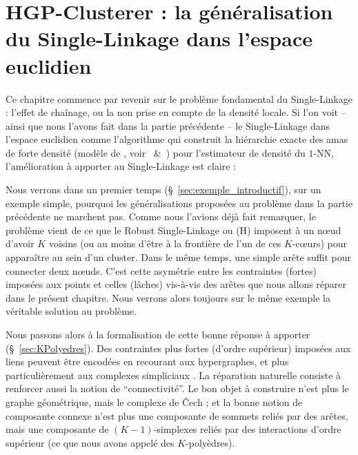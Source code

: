 \chapter{HGP-Clusterer : la généralisation du Single-Linkage dans l'espace euclidien} 
\label{chap:hgp_clusterer}

Ce chapitre commence par revenir sur le problème fondamental du Single-Linkage : l'effet de chaînage, ou la non prise en compte de la densité locale.
Si l'on voit -- ainsi que nous l'avons fait dans la partie précédente -- le Single-Linkage dans l'espace euclidien comme l'algorithme qui construit la hiérarchie exacte des amas de forte densité (modèle de , voir ~\&~) pour l'estimateur de densité du $1$-NN, l'amélioration à apporter au Single-Linkage est claire :

Nous verrons dans un premier temps (\S~\ref{sec:exemple_introductif}), sur un exemple simple, pourquoi les généralisations proposées au problème dans la partie précédente ne marchent pas. 
Comme nous l'avions déjà fait remarquer, le problème vient de ce que le Robust Single-Linkage \cite{RobustSingleLinkage2010} ou (H)\DBSCAN \cite{HDBSCAN, HDBSCAN2017} imposent à un n\oe ud d'avoir $K$ voisins  (ou au moins d'être à la frontière de l'un de ces $K$-cœurs) pour apparaître au sein d'un cluster. Dans le même temps, une simple arête suffit pour connecter deux n\oe uds.
C'est cette asymétrie entre les contraintes (fortes) imposées aux points et celles (lâches) vis-à-vis des arêtes que nous allons réparer dans le présent chapitre.
Nous verrons alors toujours sur le même exemple la véritable solution au problème.

Nous passons alors à la formalisation de cette bonne réponse à apporter (\S~\ref{sec:KPolyedres}).
Des contraintes plus fortes (d'ordre supérieur) imposées aux liens peuvent être encodées en recourant aux hypergraphes, et plus particulièrement aux complexes simpliciaux \cite{Munkres}.
La réparation naturelle consiste à renforcer aussi la notion de ``connectivité''. 
Le bon objet à construire n'est plus le graphe géométrique, mais le complexe de \v Cech \cite{Cech1932, BobrowskiKahle} ; et la bonne notion de composante connexe n'est plus une composante de sommets reliés par des arêtes, mais une composante de $(K-1)$-simplexes reliés par des interactions d'ordre supérieur (ce que nous avons appelé des $K$-polyèdres).

